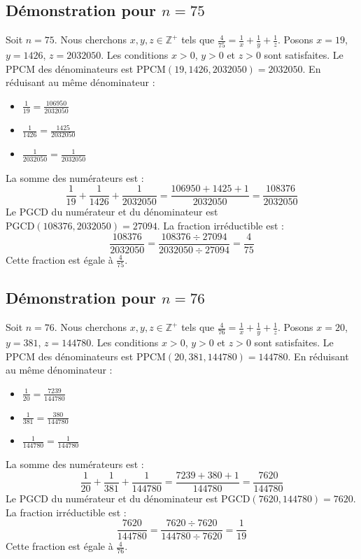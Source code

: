 \documentclass[11pt,a4paper]{article}
\begin{document}
\subsection{Démonstration pour $n = 75$}
Soit $n = 75$. Nous cherchons $x, y, z \in \mathbb{Z}^{+}$ tels que $\frac{4}{75} = \frac{1}{x} + \frac{1}{y} + \frac{1}{z}$.
Posons $x = 19$, $y = 1426$, $z = 2032050$.
Les conditions $x > 0$, $y > 0$ et $z > 0$ sont satisfaites.
Le PPCM des dénominateurs est $\text{PPCM}(19, 1426, 2032050) = 2032050$.
En réduisant au même dénominateur :
\begin{itemize}
    \item $\frac{1}{19} = \frac{106950}{2032050}$
    \item $\frac{1}{1426} = \frac{1425}{2032050}$
    \item $\frac{1}{2032050} = \frac{1}{2032050}$
\end{itemize}
La somme des numérateurs est :
$$ \frac{1}{19} + \frac{1}{1426} + \frac{1}{2032050} = \frac{106950 + 1425 + 1}{2032050} = \frac{108376}{2032050} $$
Le PGCD du numérateur et du dénominateur est $\text{PGCD}(108376, 2032050) = 27094$.
La fraction irréductible est :
$$ \frac{108376}{2032050} = \frac{108376 \div 27094}{2032050 \div 27094} = \frac{4}{75} $$
Cette fraction est égale à $\frac{4}{75}$.

\subsection{Démonstration pour $n = 76$}
Soit $n = 76$. Nous cherchons $x, y, z \in \mathbb{Z}^{+}$ tels que $\frac{4}{76} = \frac{1}{x} + \frac{1}{y} + \frac{1}{z}$.
Posons $x = 20$, $y = 381$, $z = 144780$.
Les conditions $x > 0$, $y > 0$ et $z > 0$ sont satisfaites.
Le PPCM des dénominateurs est $\text{PPCM}(20, 381, 144780) = 144780$.
En réduisant au même dénominateur :
\begin{itemize}
    \item $\frac{1}{20} = \frac{7239}{144780}$
    \item $\frac{1}{381} = \frac{380}{144780}$
    \item $\frac{1}{144780} = \frac{1}{144780}$
\end{itemize}
La somme des numérateurs est :
$$ \frac{1}{20} + \frac{1}{381} + \frac{1}{144780} = \frac{7239 + 380 + 1}{144780} = \frac{7620}{144780} $$
Le PGCD du numérateur et du dénominateur est $\text{PGCD}(7620, 144780) = 7620$.
La fraction irréductible est :
$$ \frac{7620}{144780} = \frac{7620 \div 7620}{144780 \div 7620} = \frac{1}{19} $$
Cette fraction est égale à $\frac{4}{76}$.
\end{document}
